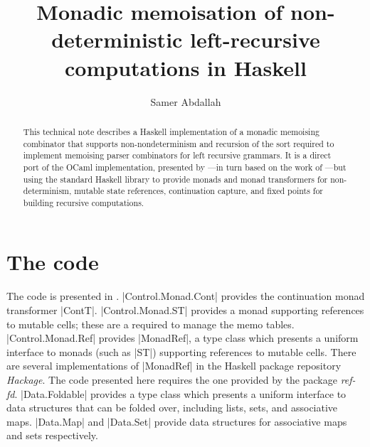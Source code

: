 \documentclass[a4paper,10pt]{article}
\title{Monadic memoisation of non-deterministic left-recursive computations in Haskell}
\author{Samer Abdallah}
\begin{document}
\maketitle
\begin{abstract}
This technical note describes a Haskell implementation of a monadic memoising combinator that
supports non-nondeterminism and recursion of the sort required to implement memoising parser
combinators for left recursive grammars. It is a direct port of the OCaml implementation, 
presented by \cite{Abdallah2017a}---in turn based on the work of \cite{Johnson1995}---but using the standard Haskell library to provide 
monads and monad transformers for non-determinism, mutable state references, continuation capture,
and fixed points for building recursive computations.
\end{abstract}

\section{The code}
The code is presented in .
|Control.Monad.Cont| provides the continuation monad transformer |ContT|.
|Control.Monad.ST| provides a monad supporting references to mutable cells; these are a required
to manage the memo tables. |Control.Monad.Ref| provides |MonadRef|, a type class which presents 
a uniform interface to monads (such as |ST|) supporting references to mutable cells. There are several implementations
of |MonadRef| in the Haskell package repository \emph{Hackage}. The code presented here requires
the one provided by the package \emph{ref-fd}. 
|Data.Foldable| provides a type class which presents a uniform interface to data structures
that can be folded over, including lists, sets, and associative maps. |Data.Map| and |Data.Set| provide
data structures for associative maps and sets respectively.
\end{document}
